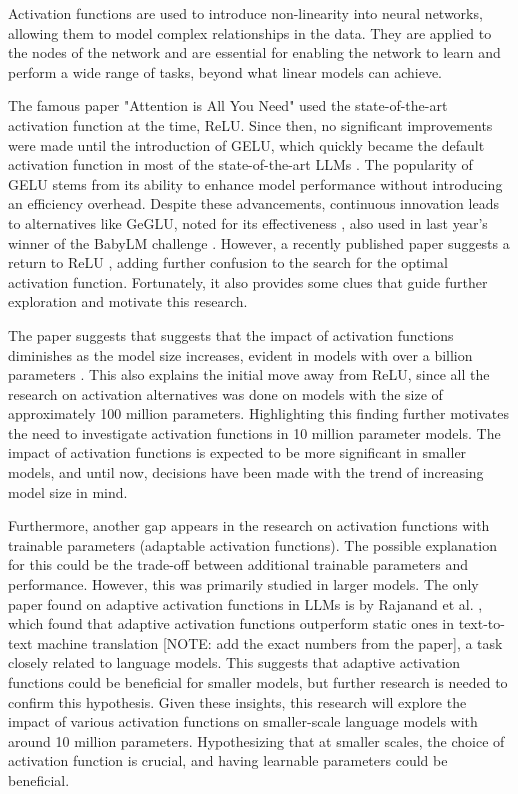 Activation functions are used to introduce non-linearity into neural networks, allowing them to model complex relationships in the data. They are applied to the nodes of the network and are essential for enabling the network to learn and perform a wide range of tasks, beyond what linear models can achieve.

The famous paper "Attention is All You Need" \cite{Vaswani2017} used the state-of-the-art activation function at the time, ReLU. Since then, no significant improvements were made until the introduction of GELU, which quickly became the default activation function in most of the state-of-the-art LLMs \cite{Lee2023}. The popularity of GELU stems from its ability to enhance model performance without introducing an efficiency overhead. Despite these advancements, continuous innovation leads to alternatives like GeGLU, noted for its effectiveness \cite{Shazeer2020}, also used in last year's winner of the BabyLM challenge \cite{Samuel2023}. However, a recently published paper suggests a return to ReLU \cite{Mirzadeh2023}, adding further confusion to the search for the optimal activation function. Fortunately, it also provides some clues that guide further exploration and motivate this research.

The paper suggests that suggests that the impact of activation functions diminishes as the model size increases, evident in models with over a billion parameters \cite{Mirzadeh2023}. This also explains the initial move away from ReLU, since all the research on activation alternatives was done on models with the size of approximately 100 million parameters. Highlighting this finding further motivates the need to investigate activation functions in 10 million parameter models. The impact of activation functions is expected to be more significant in smaller models, and until now, decisions have been made with the trend of increasing model size in mind.

Furthermore, another gap appears in the research on activation functions with trainable parameters (adaptable activation functions). The possible explanation for this could be the trade-off between additional trainable parameters and performance. However, this was primarily studied in larger models. The only paper found on adaptive activation functions in LLMs is by Rajanand et al. \cite{Rajanand}, which found that adaptive activation functions outperform static ones in text-to-text machine translation [NOTE: add the exact numbers from the paper], a task closely related to language models. This suggests that adaptive activation functions could be beneficial for smaller models, but further research is needed to confirm this hypothesis. Given these insights, this research will explore the impact of various activation functions on smaller-scale language models with around 10 million parameters. Hypothesizing that at smaller scales, the choice of activation function is crucial, and having learnable parameters could be beneficial.


